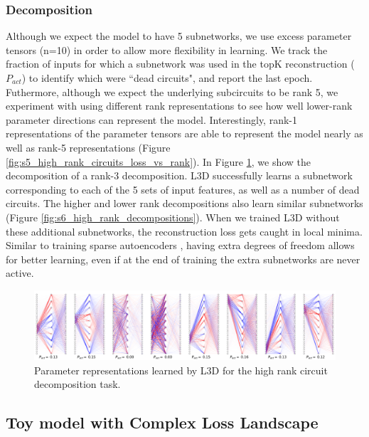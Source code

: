 \documentclass{article}
\theoremstyle{plain}
\theoremstyle{definition}
\theoremstyle{remark}
\begin{document}
\subsubsection{Decomposition}

Although we expect the model to have 5 subnetworks, we use excess parameter tensors (n=10) in order to allow more flexibility in learning. We track the fraction of inputs for which a subnetwork was used in the topK reconstruction ($P_{act}$) to identify which were ``dead circuits", and report the last epoch. Futhermore, although we expect the underlying subcircuits to be rank 5, we experiment with using different rank representations to see how well lower-rank parameter directions can represent the model. Interestingly, rank-1 representations of the parameter tensors are able to represent the model nearly as well as rank-5 representations (Figure \ref{fig:s5_high_rank_circuits_loss_vs_rank}). In Figure \ref{fig:7_high_rank_decomposition}, we show the decomposition of a rank-3 decomposition. L3D successfully learns a subnetwork corresponding to each of the 5 sets of input features, as well as a number of dead circuits. The higher and lower rank decompositions also learn similar subnetworks (Figure \ref{fig:s6_high_rank_decompositions}). When we trained L3D without these additional subnetworks, the reconstruction loss gets caught in local minima. Similar to training sparse autoencoders \cite{cunningham2023sparse}, having extra degrees of freedom allows for better learning, even if at the end of training the extra subnetworks are never active.


\begin{figure}[htbp]
    \centerline{\includegraphics[width=\textwidth]{../figures/7_high_rank_decomposition.pdf}}
    \centering
    \caption{Parameter representations learned by L3D for the high rank circuit decomposition task.}\label{fig:7_high_rank_decomposition}
\end{figure}


\subsection{Toy model with Complex Loss Landscape}
\end{document}
